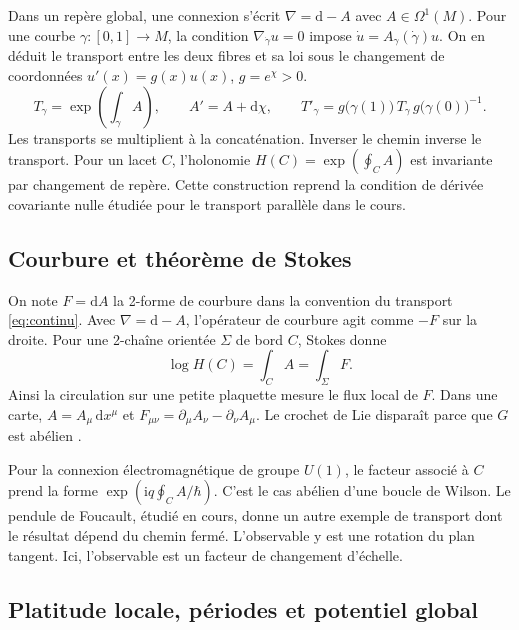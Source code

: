\documentclass[11pt,a4paper]{article}
\theoremstyle{clair}
\newcommand{\dd}{\mathrm{d}}
\begin{document}
Dans un repère global, une connexion s'écrit \(\nabla=\dd-A\) avec \(A\in\Omega^1(M)\). Pour une courbe \(\gamma\colon[0,1]\to M\), la condition \(\nabla_{\dot\gamma}u=0\) impose \(\dot u=A_{\gamma}(\dot\gamma)u\). On en déduit le transport entre les deux fibres et sa loi sous le changement de coordonnées \(u'(x)=g(x)u(x)\), \(g=e^\chi>0\).
\begin{equation}
 T_\gamma=\exp\!\left(\int_\gamma A\right),\qquad
 A'=A+\dd\chi,\qquad
 T'_\gamma=g\bigl(\gamma(1)\bigr)\,T_\gamma\,g\bigl(\gamma(0)\bigr)^{-1}.
 \label{eq:continu}
\end{equation}
Les transports se multiplient à la concaténation. Inverser le chemin inverse le transport. Pour un lacet \(C\), l'holonomie \(H(C)=\exp(\oint_C A)\) est invariante par changement de repère. Cette construction reprend la condition de dérivée covariante nulle étudiée pour le transport parallèle dans le cours.

\subsection{Courbure et théorème de Stokes}

On note \(F=\dd A\) la 2-forme de courbure dans la convention du transport \eqref{eq:continu}. Avec \(\nabla=\dd-A\), l'opérateur de courbure agit comme \(-F\) sur la droite. Pour une 2-chaîne orientée \(\Sigma\) de bord \(C\), Stokes donne
\begin{equation}
 \log H(C)=\int_C A=\int_\Sigma F.
 \label{eq:stokes}
\end{equation}
Ainsi la circulation sur une petite plaquette mesure le flux local de \(F\). Dans une carte, \(A=A_\mu\,\dd x^\mu\) et \(F_{\mu\nu}=\partial_\mu A_\nu-\partial_\nu A_\mu\). Le crochet de Lie disparaît parce que \(G\) est abélien \cite{nakahara,tong}.

Pour la connexion électromagnétique de groupe \(U(1)\), le facteur associé à \(C\) prend la forme \(\exp(\mathrm{i}q\oint_C A/\hbar)\). C'est le cas abélien d'une boucle de Wilson. Le pendule de Foucault, étudié en cours, donne un autre exemple de transport dont le résultat dépend du chemin fermé. L'observable y est une rotation du plan tangent. Ici, l'observable est un facteur de changement d'échelle.

\clearpage
\subsection{Platitude locale, périodes et potentiel global}
\end{document}
